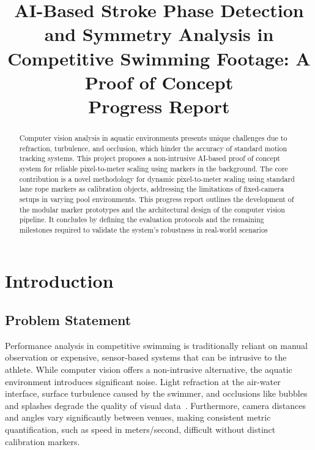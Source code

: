 \documentclass[conference]{IEEEtran}
\begin{document}
\title{AI-Based Stroke Phase Detection and Symmetry Analysis in Competitive Swimming Footage: A Proof of Concept\\
{\footnotesize Progress Report}
}

\author{
}

\maketitle

\begin{abstract}
    Computer vision analysis in aquatic environments presents unique challenges due to refraction, turbulence, and occlusion, which hinder the accuracy of standard motion tracking systems.
    This project proposes a non-intrusive AI-based proof of concept system for reliable pixel-to-meter scaling using markers in the background.
    The core contribution is a novel methodology for dynamic pixel-to-meter scaling using standard lane rope markers as calibration objects, addressing the limitations of fixed-camera setups in varying pool environments.
    This progress report outlines the development of the modular marker prototypes and the architectural design of the computer vision pipeline. 
    It concludes by defining the evaluation protocols and the remaining milestones required to validate the system's robustness in real-world scenarios
\end{abstract}


\section{Introduction}

\subsection{Problem Statement}
Performance analysis in competitive swimming is traditionally reliant on manual observation or expensive, sensor-based systems that can be intrusive to the athlete.
While computer vision offers a non-intrusive alternative, the aquatic environment introduces significant noise.
Light refraction at the air-water interface, surface turbulence caused by the swimmer, and occlusions like bubbles and splashes degrade the quality of visual data~\cite{ahmed2019, giulietti2023}.
Furthermore, camera distances and angles vary significantly between venues, making consistent metric quantification, such as speed in meters/second, difficult without distinct calibration markers.
\end{document}
